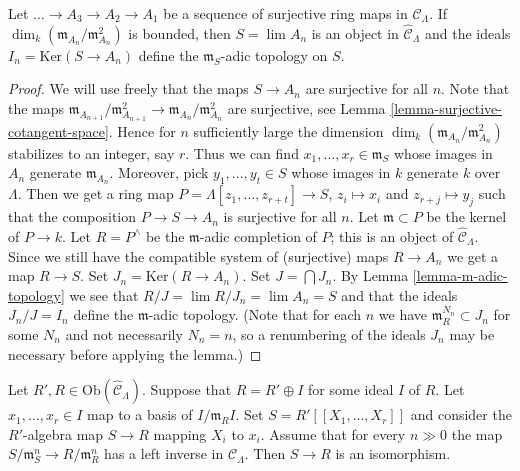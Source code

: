 \begin{lemma}
\label{lemma-limit-artinian}
Let $\ldots \to A_3 \to A_2 \to A_1$ be a sequence of surjective
ring maps in $\mathcal{C}_\Lambda$. If
$\dim_k (\mathfrak m_{A_n}/\mathfrak m_{A_n}^2)$ is bounded, then
$S = \lim A_n$ is an object in $\widehat{\mathcal{C}}_\Lambda$
and the ideals $I_n = \text{Ker}(S \to A_n)$ define the
$\mathfrak m_S$-adic topology on $S$.
\end{lemma}

\begin{proof}
We will use freely that the maps $S \to A_n$ are surjective for all $n$.
Note that the maps
$\mathfrak m_{A_{n + 1}}/\mathfrak m_{A_{n + 1}}^2 \to
\mathfrak m_{A_n}/\mathfrak m_{A_n}^2$ are surjective, see
Lemma \ref{lemma-surjective-cotangent-space}.
Hence for $n$ sufficiently large the dimension
$\dim_k (\mathfrak m_{A_n}/\mathfrak m_{A_n}^2)$ stabilizes to an
integer, say $r$.
Thus we can find $x_1, \ldots, x_r \in \mathfrak m_S$ whose images in
$A_n$ generate $\mathfrak m_{A_n}$. Moreover, pick $y_1, \ldots, y_t \in S$
whose images in $k$ generate $k$ over $\Lambda$. Then we get a ring map
$P = \Lambda[z_1, \ldots, z_{r + t}] \to S$, $z_i \mapsto x_i$ and
$z_{r + j} \mapsto y_j$ such that the composition
$P \to S \to A_n$ is surjective for all $n$. Let $\mathfrak m \subset P$
be the kernel of $P \to k$. Let $R = P^\wedge$ be the $\mathfrak m$-adic
completion of $P$; this is an object of $\widehat{\mathcal{C}}_\Lambda$.
Since we still have the compatible system of (surjective) maps $R \to A_n$
we get a map $R \to S$. Set $J_n = \text{Ker}(R \to A_n)$.
Set $J = \bigcap J_n$. By
Lemma \ref{lemma-m-adic-topology}
we see that $R/J = \lim R/J_n = \lim A_n = S$ 
and that the ideals $J_n/J = I_n$ define the $\mathfrak m$-adic topology.
(Note that for each $n$ we have $\mathfrak m_R^{N_n} \subset J_n$ for
some $N_n$ and not necessarily $N_n = n$, so a renumbering of the ideals
$J_n$ may be necessary before applying the lemma.)
\end{proof}

\begin{lemma}
\label{lemma-power-series}
Let $R', R \in \text{Ob}(\widehat{\mathcal{C}}_\Lambda)$. Suppose that
$R = R' \oplus I$ for some ideal $I$ of $R$. Let $x_1, \ldots, x_r \in I$
map to a basis of $I/\mathfrak m_R I$. Set $S = R'[[X_1, \ldots, X_r]]$
and consider the $R'$-algebra map $S \to R$ mapping $X_i$ to $x_i$.
Assume that for every $n \gg 0$ the map
$S/\mathfrak m_S^n \to R/\mathfrak m_R^n$ has a left inverse in
$\mathcal{C}_\Lambda$. Then $S \to R$ is an isomorphism.
\end{lemma}

